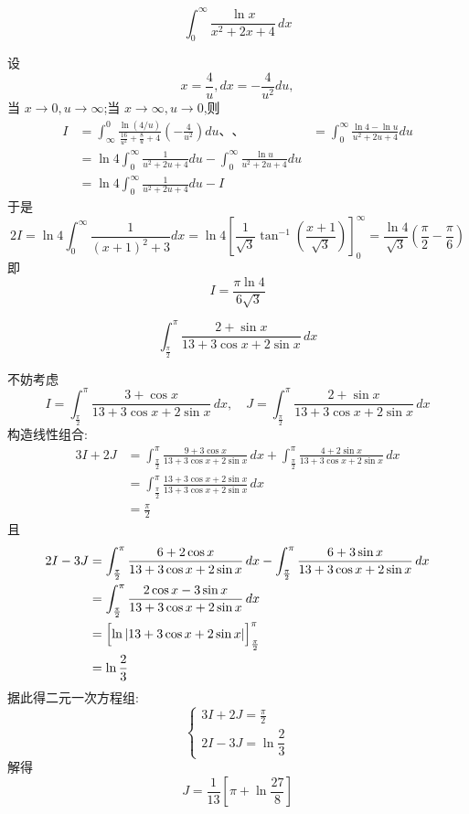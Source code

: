 \begin{questions}
    \question
    \[
    \int_{0}^{\infty} \frac{\ln x}{x^2+2x+4} \, dx
    \]
    \begin{solution}
        设 
        \[
        x = \frac{4}{u}, dx = -\frac{4}{u^2}du,
        \]
        当 $x \to 0, u \to \infty$;当 $x \to \infty, u \to 0$,则
        \begin{align*}
        I &= \int_{\infty}^{0} \frac{\ln(4/u)}{\frac{16}{u^2} + \frac{8}{u} + 4} \left(-\frac{4}{u^2}\right) du 、、
        &= \int_{0}^{\infty} \frac{\ln 4 - \ln u}{u^2+2u+4} du \\
        &= \ln 4 \int_{0}^{\infty} \frac{1}{u^2+2u+4} du - \int_{0}^{\infty} \frac{\ln u}{u^2+2u+4} du \\
        &= \ln 4 \int_{0}^{\infty} \frac{1}{u^2+2u+4} du - I
        \end{align*}
        于是
        \[
        2I = \ln 4 \int_{0}^{\infty} \frac{1}{(x+1)^2+3} dx 
        = \ln 4 \left[ \frac{1}{\sqrt{3}} \tan^{-1}\left(\frac{x+1}{\sqrt{3}}\right) \right]_{0}^{\infty} 
        = \frac{\ln 4}{\sqrt{3}} \left( \frac{\pi}{2} - \frac{\pi}{6} \right) 
        \]
        即
        \[
        I = \frac{\pi \ln 4}{6\sqrt{3}}
        \]
    \end{solution}
    \question
    \[
    \int_{\frac{\pi}{2}}^{\pi} \frac{2+\sin x}{13+3\cos x+2\sin x} \, dx
    \]
    \begin{solution}
        不妨考虑
        \[
        I = \int_{\frac{\pi}{2}}^{\pi} \frac{3+\cos x}{13+3\cos x+2\sin x} \, dx, \quad
        J = \int_{\frac{\pi}{2}}^{\pi} \frac{2+\sin x}{13+3\cos x+2\sin x} \, dx
        \]
        构造线性组合:
        \begin{align*}
        3I + 2J &= \int_{\frac{\pi}{2}}^{\pi} \frac{9+3\cos x}{13+3\cos x+2\sin x} \, dx
        + \int_{\frac{\pi}{2}}^{\pi} \frac{4+2\sin x}{13+3\cos x+2\sin x} \, dx \\
        &= \int_{\frac{\pi}{2}}^{\pi} \frac{13+3\cos x+2\sin x}{13+3\cos x+2\sin x} \, dx \\
        &= \frac{\pi}{2}
        \end{align*}
        且
        \begin{align*}
        2I - 3J &= \int_{\frac{\pi}{2}}^{\pi} \frac{6+2\cos x}{13+3\cos x+2\sin x} \, dx
        - \int_{\frac{\pi}{2}}^{\pi} \frac{6+3\sin x}{13+3\cos x+2\sin x} \, dx \\
        &= \int_{\frac{\pi}{2}}^{\pi} \frac{2\cos x - 3\sin x}{13+3\cos x+2\sin x} \, dx \\
        &= \Bigl[\ln|13+3\cos x+2\sin x|\Bigr]_{\frac{\pi}{2}}^{\pi} \\
        &= \ln \frac{2}{3}
        \end{align*}
        据此得二元一次方程组:
        \[
        \begin{cases}
        3I + 2J = \frac{\pi}{2} \\[4pt]
        2I - 3J = \ln \dfrac{2}{3}
        \end{cases}
        \]
        解得
        \[
        J = \frac{1}{13}\left[\pi + \ln \frac{27}{8}\right]
        \]
    \end{solution}


\end{questions}
